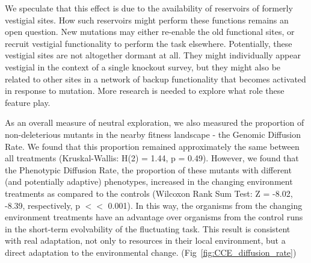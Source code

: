 \documentclass[10pt,letterpaper,final]{article}
\begin{document}
We speculate that this effect is due to the availability of reservoirs of formerly vestigial sites. How such reservoirs might perform these functions remains an open question. New mutations may either re-enable the old functional sites, or recruit vestigial functionality to perform the task elsewhere. Potentially, these vestigial sites are not altogether dormant at all. They might individually appear vestigial in the context of a single knockout survey, but they might also be related to other sites in a network of backup functionality that becomes activated in response to mutation. More research is needed to explore what role these feature play. 






As an overall measure of neutral exploration, we also measured the proportion of non-deleterious mutants in the nearby fitness landscape - the Genomic Diffusion Rate. We found that this proportion remained approximately the same between all treatments (Kruskal-Wallis: H(2) = 1.44, p = 0.49). However, we found that the Phenotypic Diffusion Rate, the proportion of these mutants with different (and potentially adaptive) phenotypes, increased in the changing environment treatments as compared to the controls (Wilcoxon Rank Sum Test: Z = -8.02, -8.39, respectively, p $<<$ 0.001). In this way, the organisms from the changing environment treatments have an advantage over organisms from the control runs in the short-term evolvability of the fluctuating task. This result is consistent with real adaptation, not only to resources in their local environment, but a direct adaptation to the environmental change. (Fig~\ref{fig:CCE_diffusion_rate})
\end{document}
